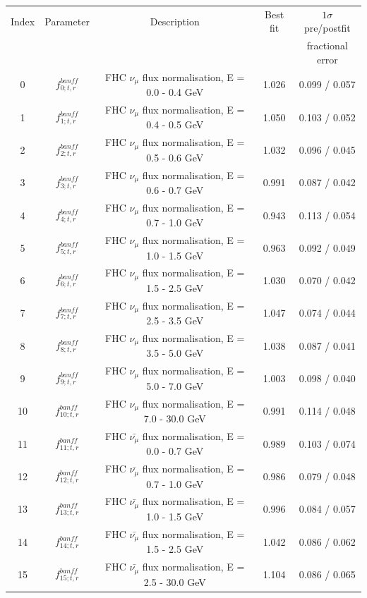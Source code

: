 \begin{tabular} { | c | c | c | c | c |  }
\hline 
Index & Parameter & Description & Best fit & $1\sigma$ pre/postfit\\ 
 & &  &  & fractional error\\
\hline 
0 & $f_{0; t, r}^{banff}$ & FHC $\nu_\mu$ flux normalisation, E = 0.0 - 0.4 GeV & 1.026 & 0.099 / 0.057\\ 
1 & $f_{1; t, r}^{banff}$ & FHC $\nu_\mu$ flux normalisation, E = 0.4 - 0.5 GeV & 1.050 & 0.103 / 0.052\\ 
2 & $f_{2; t, r}^{banff}$ & FHC $\nu_\mu$ flux normalisation, E = 0.5 - 0.6 GeV & 1.032 & 0.096 / 0.045\\ 
3 & $f_{3; t, r}^{banff}$ & FHC $\nu_\mu$ flux normalisation, E = 0.6 - 0.7 GeV & 0.991 & 0.087 / 0.042\\ 
4 & $f_{4; t, r}^{banff}$ & FHC $\nu_\mu$ flux normalisation, E = 0.7 - 1.0 GeV & 0.943 & 0.113 / 0.054\\ 
5 & $f_{5; t, r}^{banff}$ & FHC $\nu_\mu$ flux normalisation, E = 1.0 - 1.5 GeV & 0.963 & 0.092 / 0.049\\ 
6 & $f_{6; t, r}^{banff}$ & FHC $\nu_\mu$ flux normalisation, E = 1.5 - 2.5 GeV & 1.030 & 0.070 / 0.042\\ 
7 & $f_{7; t, r}^{banff}$ & FHC $\nu_\mu$ flux normalisation, E = 2.5 - 3.5 GeV & 1.047 & 0.074 / 0.044\\ 
8 & $f_{8; t, r}^{banff}$ & FHC $\nu_\mu$ flux normalisation, E = 3.5 - 5.0 GeV & 1.038 & 0.087 / 0.041\\ 
9 & $f_{9; t, r}^{banff}$ & FHC $\nu_\mu$ flux normalisation, E = 5.0 - 7.0 GeV & 1.003 & 0.098 / 0.040\\ 
10 & $f_{10; t, r}^{banff}$ & FHC $\nu_\mu$ flux normalisation, E = 7.0 - 30.0 GeV & 0.991 & 0.114 / 0.048\\ 
11 & $f_{11; t, r}^{banff}$ & FHC $\bar{\nu_\mu}$ flux normalisation, E = 0.0 - 0.7 GeV & 0.989 & 0.103 / 0.074\\ 
12 & $f_{12; t, r}^{banff}$ & FHC $\bar{\nu_\mu}$ flux normalisation, E = 0.7 - 1.0 GeV & 0.986 & 0.079 / 0.048\\ 
13 & $f_{13; t, r}^{banff}$ & FHC $\bar{\nu_\mu}$ flux normalisation, E = 1.0 - 1.5 GeV & 0.996 & 0.084 / 0.057\\ 
14 & $f_{14; t, r}^{banff}$ & FHC $\bar{\nu_\mu}$ flux normalisation, E = 1.5 - 2.5 GeV & 1.042 & 0.086 / 0.062\\ 
15 & $f_{15; t, r}^{banff}$ & FHC $\bar{\nu_\mu}$ flux normalisation, E = 2.5 - 30.0 GeV & 1.104 & 0.086 / 0.065\\ 

\end{tabular}
